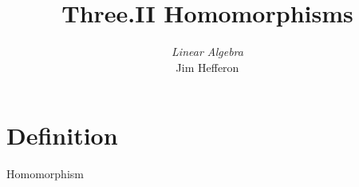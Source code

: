 \documentclass[10pt,t]{beamer}
\title[Homomorphisms] %
{Three.II Homomorphisms}
\author{\textit{Linear Algebra} \\ {\small Jim Hef{}feron}}
\institute{
  \texttt{http://joshua.smcvt.edu/linearalgebra}
}
\date{}
\begin{document}
\begin{frame}
  \titlepage
\end{frame}




\section{Definition}
\begin{frame}{Homomorphism}
\end{frame}




\end{document}

